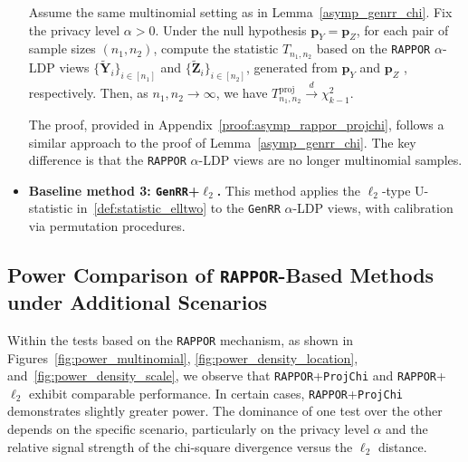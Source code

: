 \documentclass[twoside,11pt]{article}
\newcommand{\alphabetSize}{k} %
\newcommand{\sampleSize}{n}
\newcommand{\privacyParameter}{\alpha} %
\begin{document}
\begin{appendix}
\begin{itemize}
	\begin{lemma} \label{asymp_rappor_projchi} 
		Assume the same multinomial setting as in Lemma~\ref{asymp_genrr_chi}.
		Fix the privacy level $\privacyParameter>0$.
		Under the null hypothesis $\mathbf{p}_Y = \mathbf{p}_Z$, for each pair of sample sizes $(n_1, n_2)$, compute the statistic $T_{n_1, n_2}$ based on the  \textnormal{\texttt{RAPPOR}} $\privacyParameter$-LDP views $\{\tilde{\mathbf{Y}}_i\}_{i \in [n_1]}$ and $\{\tilde{\mathbf{Z}}_i\}_{i \in [n_2]}$, generated from $\mathbf{p}_Y$ and $\mathbf{p}_Z$ , respectively. Then, as $n_1, n_2 \to \infty$, we have $T^{\mathrm{proj}}_{\sampleSize_1, \sampleSize_2}
		\stackrel{d}{\to} \chi^2_{\alphabetSize-1}$.
	\end{lemma}
	The proof, provided in Appendix~\ref{proof:asymp_rappor_projchi}, follows a similar approach to the proof of Lemma~\ref{asymp_genrr_chi}. The key difference is that the \texttt{RAPPOR} $\privacyParameter$-LDP views are no longer multinomial samples.
	\item \textbf{Baseline method 3: \texttt{GenRR}+$\ell_2$.} This method applies the $\ell_2$-type U-statistic in~\eqref{def:statistic_elltwo} to the \texttt{GenRR} $\privacyParameter$-LDP views, with calibration via  permutation procedures.
	\end{itemize}
	\subsection{Power Comparison of \texttt{RAPPOR}-Based Methods under Additional Scenarios}\label{appendix:powerlaw}
	Within the tests based on the \texttt{RAPPOR} mechanism, as shown in Figures~\ref{fig:power_multinomial}, \ref{fig:power_density_location}, and~\ref{fig:power_density_scale}, we observe that \texttt{RAPPOR}+\texttt{ProjChi} and \texttt{RAPPOR}+$\ell_2$ exhibit comparable performance. In certain cases, \texttt{RAPPOR}+\texttt{ProjChi} demonstrates slightly greater power. The dominance of one test over the other depends on the specific scenario, particularly on the privacy level $\privacyParameter$ and the relative signal strength of the chi-square divergence versus the $\ell_2$ distance. 
	

\end{appendix}
\end{document}
